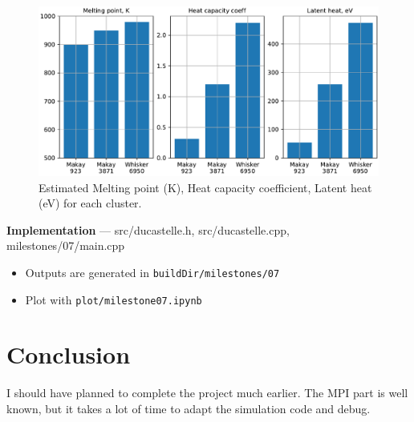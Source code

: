 \documentclass[12pt,a4paper]{article}
\begin{document}
\begin{figure}[htb]
	\centering
	\includegraphics[width=.9\linewidth]{img/milestone07-bar.pdf}
	\caption{Estimated Melting point (K), Heat capacity coefficient, Latent heat (eV) for each cluster.}
	\label{fig:heat-estimated}
\end{figure}

\newpage

{\bf Implementation} --- src/ducastelle.h, src/ducastelle.cpp, milestones/07/main.cpp

\begin{itemize}
	\item Outputs are generated in \verb|buildDir/milestones/07|
	\item Plot with \verb|plot/milestone07.ipynb|
\end{itemize}


\section{Conclusion}
\label{conclusion}

I should have planned to complete the project much earlier. The MPI part is well known, but it takes a lot of time to adapt the simulation code and debug.

\newpage
{\small
	
	
}
\end{document}
